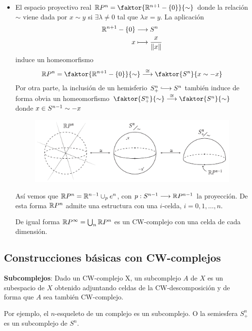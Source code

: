 \begin{ejems}
\begin{itemize}
\item El espacio proyectivo real $\mathbb{R}P^n = \faktor{\bb{R}^{n+1}-\{0\}}{\sim}$ donde la relación $\sim$ viene dada por $x \sim y$ si $\exists \lambda \neq 0$ tal que $\lambda x = y$. La aplicación 
\begin{align*}
\bb{R}^{n+1} - \{0\} &\longrightarrow S^n \\
x &\longmapsto \frac{x}{\|x\|}
\end{align*}
induce un homeomorfismo
\[ \bb{R}P^n = \faktor{\bb{R}^{n+1} -\{0\}}{\sim} \stackrel{\cong}{\longrightarrow} \faktor{S^n}{x \sim -x} \]
Por otra parte, la inclusión de un hemisferio $S_+^n \longhookrightarrow S^n$ también induce de forma obvia un homeomorfismo $\faktor{S_+^n}{\sim} \stackrel{\cong}{\longrightarrow} \faktor{S^n}{\sim}$ donde $x \in S^{n-1} \sim \nobreak -x$ \par
\begin{figure}[h]
\centering
\includegraphics[width=\textwidth]{images/proyecreal.pdf}
\end{figure}
\par 
Así vemos que $\mathbb{R}P^n = \mathbb{R}^{n-1} \cup_p e^n$, con $p : S^{n-1} \longrightarrow \bb{R}P^{n-1}$ la proyección. De esta forma $\mathbb{R}P^n$ admite una estructura con una $i$-celda, $i = 0, 1, \ldots ,n$. \par 
De igual forma $\mathbb{R}P^\infty = \bigcup_n \mathbb{R}P^n$ es un CW-complejo con una celda de cada dimensión. 
\end{itemize}
\end{ejems}

\subsection{Construcciones básicas con CW-complejos}
\textbf{Subcomplejos}: Dado un CW-complejo X, un subcomplejo $A$ de $X$ es un subespacio de $X$ obtenido adjuntando celdas de la CW-descomposición y de forma que $A$ sea también CW-complejo. \par
Por ejemplo, el $n$-esqueleto de un complejo es un subcomplejo. O la semiesfera $S_+^n$ es un subcomplejo de $S^n$. \par

